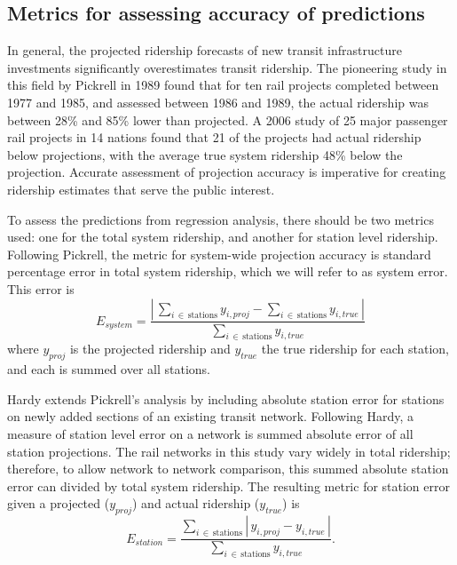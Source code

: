 \documentclass[11pt]{article}
\begin{document}
\subsection{Metrics for assessing accuracy of predictions}\label{sec:metric}

In general, the projected ridership forecasts of new transit infrastructure investments significantly overestimates transit ridership. The pioneering study in this field by Pickrell in 1989 \cite{Pickrell1989} found that for ten rail projects completed between 1977 and 1985, and assessed between 1986 and 1989, the actual ridership was between 28\% and 85\% lower than projected. A 2006 study \cite{Flyvbjerg2006} of 25 major passenger rail projects in 14 nations found that 21 of the projects had actual ridership below projections, with the average true system ridership 48\% below the projection. Accurate assessment of projection accuracy is imperative for creating ridership estimates that serve the public interest.

To assess the predictions from regression analysis, there should be two metrics used: one for the total system ridership, and another for station level ridership. Following Pickrell, the metric for system-wide projection accuracy is standard percentage error in total system ridership, which we will refer to as system error. This error is
$$E_{system} = \dfrac{\left|\,\sum\limits_{i\,\in\,\text{stations}} y_{i, proj} - \sum\limits_{i\,\in\,\text{stations}} y_{i, true}\,\right|}{\sum\limits_{i\,\in\,\text{stations}} y_{i, true}}$$
where $y_{proj}$ is the projected ridership and $y_{true}$ the true ridership for each station, and each is summed over all stations.

Hardy \cite{Hardy2010} extends Pickrell's analysis by including absolute station error for stations on newly added sections of an existing transit network. Following Hardy, a measure of station level error on a network is summed absolute error of all station projections. The rail networks in this study vary widely in total ridership; therefore, to allow network to network comparison, this summed absolute station error can divided by total system ridership. The resulting metric for station error given a projected ($y_{proj}$) and actual ridership ($y_{true}$) is 
$$E_{station} = \dfrac{\sum\limits_{i\,\in\,\text{stations}}\left|\,y_{i, proj} - y_{i, true}\,\right|}{\sum\limits_{i\,\in\,\text{stations}} y_{i, true}}.$$
\end{document}
